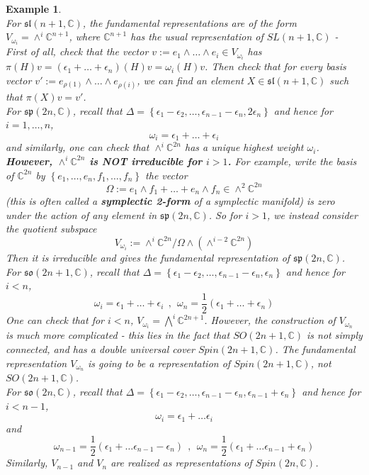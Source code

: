 \documentclass[11pt]{article}
\newtheorem{example}[theorem]{Example}
\newcommand{\bb}[1]{\mathbb{#1}}
\newcommand{\mf}[1]{\mathfrak{#1}}
\begin{document}
\begin{example} \mbox{}\\
For $\mf{sl}(n+1,\bb{C})$, the fundamental representations are of the form $V_{\omega_i} = \wedge^i \bb{C}^{n+1}$, where $\bb{C}^{n+1}$ has the usual representation of $SL(n+1,\bb{C})$ -\\
First of all, check that the vector $v := e_1 \wedge \dots \wedge e_i \in V_{\omega_i}$ has $\pi(H)v = (\epsilon_1 + \dots + \epsilon_n)(H)v = \omega_i(H)v$. Then check that for every basis vector $v' := e_{\rho(1)} \wedge \dots \wedge e_{\rho(i)}$, we can find an element $X \in \mf{sl}(n+1,\bb{C})$ such that $\pi(X)v = v'$.\\

\noindent For $\mf{sp}(2n,\bb{C})$, recall that $\Delta = \left\{ \epsilon_1 - \epsilon_2, \dots, \epsilon_{n-1} - \epsilon_n, 2\epsilon_n\right\}$ and hence for $i =1, \dots, n$,
$$\omega_i = \epsilon_1 + \dots + \epsilon_i$$
and similarly, one can check that $\wedge^i \bb{C}^{2n}$ has a unique highest weight $\omega_i$.\\
\textbf{However, $\wedge^i \bb{C}^{2n}$ is NOT irreducible for $i > 1$.} For example, write the basis of $\bb{C}^{2n}$ by $\left\{e_1, \dots, e_n, f_1, \dots, f_n\right\}$ the vector
$$\Omega := e_1 \wedge f_1 + \dots + e_n \wedge f_n \in \wedge^2 \bb{C}^{2n}$$
(this is often called a \textbf{symplectic 2-form} of a symplectic manifold) is zero under the action of any element in $\mf{sp}(2n,\bb{C})$. So for $i > 1$, we instead consider the quotient subspace
$$V_{\omega_i} := \wedge^i \bb{C}^{2n}/\Omega \wedge (\wedge^{i-2}\bb{C}^{2n})$$
Then it is irreducible and gives the fundamental representation of $\mf{sp}(2n,\bb{C})$.\\

\noindent For $\mf{so}(2n+1,\bb{C})$, recall that $\Delta = \left\{ \epsilon_1 - \epsilon_2, \dots, \epsilon_{n-1} - \epsilon_n, \epsilon_n\right\}$ and hence for $i < n$,
$$\omega_i = \epsilon_1 + \dots + \epsilon_i\ \ ,\ \ \omega_n = \frac{1}{2}(\epsilon_1 + \dots + \epsilon_n)$$
One can check that for $i < n$, $V_{\omega_i} = \bigwedge^i \bb{C}^{2n+1}$. However, the construction of $V_{\omega_n}$ is much more complicated - this lies in the fact that $SO(2n+1,\bb{C})$ is not simply connected, and has a double universal cover $Spin(2n+1,\bb{C})$. The fundamental representation $V_{\omega_n}$ is going to be a representation of $Spin(2n+1,\bb{C})$, not $SO(2n+1,\bb{C})$.\\

\noindent For $\mf{so}(2n,\bb{C})$, recall that $\Delta = \left\{ \epsilon_1 - \epsilon_2, \dots, \epsilon_{n-1} - \epsilon_n, \epsilon_{n-1}+ \epsilon_n\right\}$ and hence for $i < n-1$,
$$\omega_i = \epsilon_1 + \dots \epsilon_i$$
and
$$\omega_{n-1} = \frac{1}{2}(\epsilon_1 + \dots \epsilon_{n-1} - \epsilon_n)\ \ ,\ \ \omega_{n} = \frac{1}{2}(\epsilon_1 + \dots \epsilon_{n-1} + \epsilon_n)$$
Similarly, $V_{n-1}$ and $V_n$ are realized as representations of $Spin(2n,\bb{C})$.
\end{example}
\end{document}
